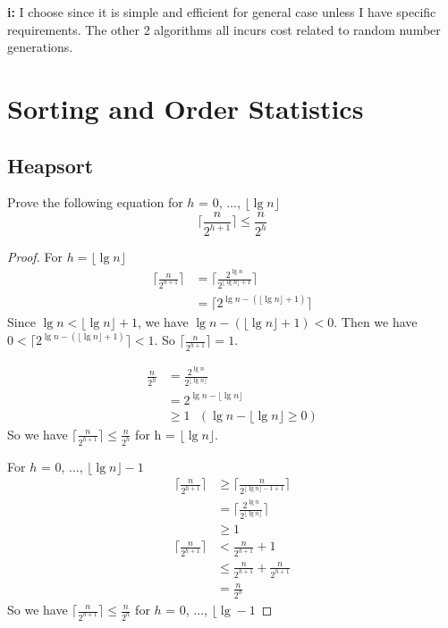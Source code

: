 \documentclass{book}
\begin{document}
\begin{CJK}{UTF8}{gkai}
\textbf{i:} I choose  since it is simple and 
efficient for general case unless I have specific requirements. The other 2 
algorithms all incurs cost related to random number generations.

\part{Sorting and Order Statistics}

\chapter{Heapsort}
Prove the following equation for $h$ = $0$, ..., $\lfloor\lg n\rfloor$
\begin{equation}
  \lceil\frac{n}{2^{h+1}}\rceil \le \frac{n}{2^h}
\end{equation}

\begin{proof}
  For $h = \lfloor\lg n\rfloor$
  \begin{align*}
    \lceil\frac{n}{2^{h+1}}\rceil & = \lceil\frac{2^{\lg n}}{2^{\lfloor\lg 
n\rfloor+1}}\rceil \\
& = \lceil 2^{\lg n - (\lfloor \lg n \rfloor + 1)}\rceil
  \end{align*}
  Since $\lg n < \lfloor \lg n \rfloor + 1$, we have $\lg n - (\lfloor \lg n 
  \rfloor + 1) < 0$. Then we have $0 < \lceil 2^{\lg n - (\lfloor \lg n \rfloor + 
  1)}\rceil < 1$. So $\lceil\frac{n}{2^{h+1}}\rceil = 1$.

  \begin{align*}
    \frac{n}{2^h} & = \frac{2^{\lg n}}{2^{\lfloor\lg n\rfloor}} \\
                  & = 2^{\lg n - \lfloor \lg n \rfloor} \\
                  & \ge 1\text{  }(\lg n - \lfloor \lg n \rfloor \ge 0)
  \end{align*}
  So we have $\lceil\frac{n}{2^{h+1}}\rceil \le \frac{n}{2^h}$ for h = $\lfloor\lg 
  n \rfloor$.

  For $h$ = $0$, ..., $\lfloor\lg n \rfloor - 1$
  \begin{align*}
    \lceil\frac{n}{2^{h+1}}\rceil & \ge \lceil\frac{n}{2^{\lfloor\lg n\rfloor - 
1+1}}\rceil \\
& = \lceil\frac{2^{\lg n}}{2^{\lfloor\lg n\rfloor}}\rceil \\
& \ge 1
  \end{align*}
  \begin{align*}
    \lceil\frac{n}{2^{h+1}}\rceil & < \frac{n}{2^{h+1}} + 1 \\
                                  & \le \frac{n}{2^{h+1}} + \frac{n}{2^{h+1}} \\
                                  & = \frac{n}{2^h}
  \end{align*}
  So we have $\lceil\frac{n}{2^{h+1}}\rceil \le \frac{n}{2^h}$ for $h$ = $0$, 
  ..., $\lfloor\lg - 1$
\end{proof}


\end{CJK}
\end{document}
